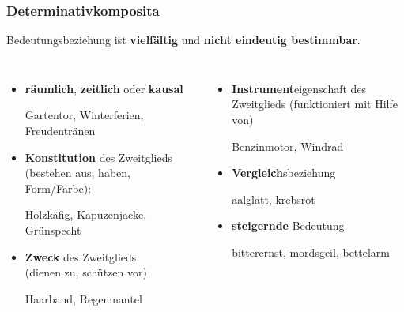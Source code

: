 \begin{frame}
\frametitle{Determinativkomposita}


Bedeutungsbeziehung ist \textbf{vielfältig} und \textbf{nicht eindeutig bestimmbar}.

\begin{columns}
	

\begin{itemize}

	\item \textbf{räumlich},  \textbf{zeitlich} oder \textbf{kausal}
	
	\ea Gartentor, Winterferien, Freudentränen
	\z
	
	\item \textbf{Konstitution} des Zweitglieds (bestehen aus, haben, Form/Farbe):
	
	\ea Holzkäfig, Kapuzenjacke, Grünspecht
	\z

	\item \textbf{Zweck} des Zweitglieds \\
	(dienen zu, schützen vor)

	\ea Haarband, Regenmantel
	\z	
\end{itemize}

	
\begin{itemize}
	\item \textbf{Instrument}eigenschaft des Zweitglieds (funktioniert mit Hilfe von)
	
	\ea Benzinmotor, Windrad
	\z
	
	\item \textbf{Vergleich}sbeziehung
	
	\ea aalglatt, krebsrot
	\z
	
	\item \textbf{steigernde} Bedeutung
	
	\ea bitterernst, mordsgeil, bettelarm
	\z
\end{itemize}

\end{columns}
	
\end{frame}


